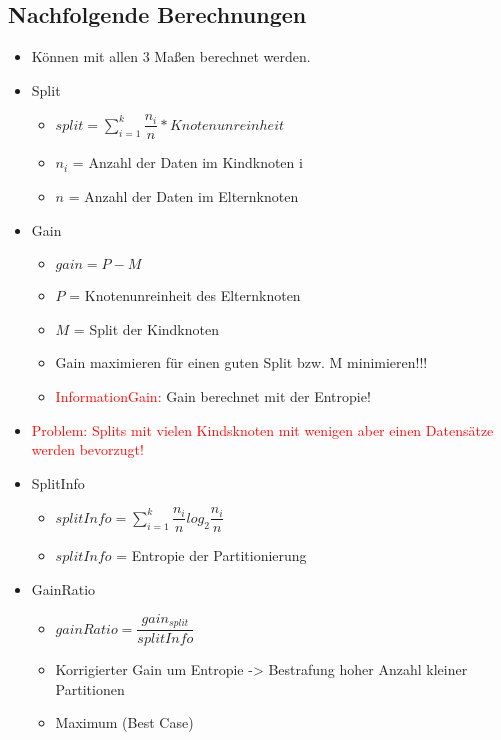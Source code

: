 \documentclass[a4paper]{article}
\begin{document}
\begin{landscape}
\begin{multicols}{3}
        \subsection{Nachfolgende Berechnungen}
        \begin{itemize}[noitemsep,nolistsep]
            \item Können mit allen 3 Maßen berechnet werden.
            \item Split
                    \begin{itemize}[noitemsep,nolistsep]
                        \item $ split = \sum_{i = 1}^{k} \dfrac{n_i}{n} * Knotenunreinheit$
                        \item $n_i$ = Anzahl der Daten im Kindknoten i
                        \item $n$ = Anzahl der Daten im Elternknoten
                    \end{itemize}
            \item Gain
                    \begin{itemize}[noitemsep,nolistsep]
                        \item $ gain = P - M$
                        \item $P$ = Knotenunreinheit des Elternknoten
                        \item $M$ = Split der Kindknoten
                        \item Gain maximieren für einen guten Split bzw. M minimieren!!!
                        \item \textcolor{red}{InformationGain: } Gain berechnet mit der Entropie!
                    \end{itemize}
            \item \textcolor{red}{Problem: Splits mit vielen Kindsknoten mit wenigen aber einen Datensätze werden bevorzugt!}
            \item SplitInfo
                    \begin{itemize}[noitemsep,nolistsep]
                        \item $ splitInfo = \sum_{i = 1}^{k} \dfrac{n_i}{n} log_2 \dfrac{n_i}{n}$
                        \item $splitInfo$ = Entropie der Partitionierung
                    \end{itemize}
            \item GainRatio
                    \begin{itemize}[noitemsep,nolistsep]
                        \item $ gainRatio = \dfrac{gain_{split}}{splitInfo}$
                        \item Korrigierter Gain um Entropie -> Bestrafung hoher Anzahl kleiner Partitionen
                        \item Maximum (Best Case)
                    \end{itemize}
        \end{itemize}


\end{multicols}
\end{landscape}
\end{document}
